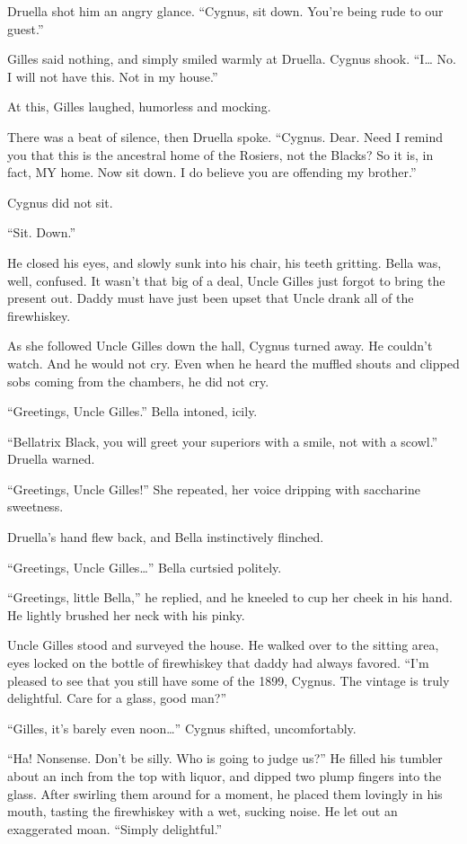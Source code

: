 Druella shot him an angry glance. “Cygnus, sit down. You’re being rude to our guest.”

Gilles said nothing, and simply smiled warmly at Druella. Cygnus shook. “I… No. I will not have this. Not in my house.”

At this, Gilles laughed, humorless and mocking.

There was a beat of silence, then Druella spoke. “Cygnus. Dear. Need I remind you that this is the ancestral home of the Rosiers, not the Blacks? So it is, in fact, MY home. Now sit down. I do believe you are offending my brother.”

Cygnus did not sit.

“Sit. Down.”

He closed his eyes, and slowly sunk into his chair, his teeth gritting. Bella was, well, confused. It wasn’t that big of a deal, Uncle Gilles just forgot to bring the present out. Daddy must have just been upset that Uncle drank all of the firewhiskey.

As she followed Uncle Gilles down the hall, Cygnus turned away. He couldn’t watch. And he would not cry. Even when he heard the muffled shouts and clipped sobs coming from the chambers, he did not cry.
\simpleline


“Greetings, Uncle Gilles.” Bella intoned, icily.

“Bellatrix Black, you will greet your superiors with a smile, not with a scowl.” Druella warned.

“Greetings, Uncle Gilles!” She repeated, her voice dripping with saccharine sweetness.

Druella’s hand flew back, and Bella instinctively flinched.

“Greetings, Uncle Gilles…” Bella curtsied politely.

“Greetings, little Bella,” he replied, and he kneeled to cup her cheek in his hand. He lightly brushed her neck with his pinky.

Uncle Gilles stood and surveyed the house. He walked over to the sitting area, eyes locked on the bottle of firewhiskey that daddy had always favored. “I’m pleased to see that you still have some of the 1899, Cygnus. The vintage is truly delightful. Care for a glass, good man?”

“Gilles, it’s barely even noon…” Cygnus shifted, uncomfortably.

“Ha! Nonsense. Don’t be silly. Who is going to judge us?” He filled his tumbler about an inch from the top with liquor, and dipped two plump fingers into the glass. After swirling them around for a moment, he placed them lovingly in his mouth, tasting the firewhiskey with a wet, sucking noise. He let out an exaggerated moan. “Simply delightful.”


